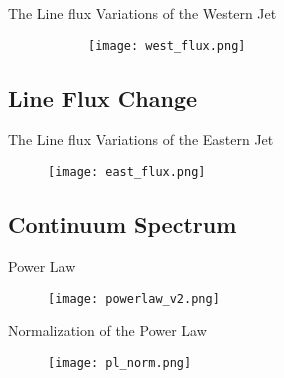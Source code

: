 \documentclass{beamer}
\begin{document}
\begin{frame}{The Line flux Variations of the Western Jet}
    \begin{figure}
        \begin{figure}
            \texttt{[image: west\_flux.png]}
            \label{west_flux}
        \end{figure}
    \end{figure}
\end{frame}


\subsection{Line Flux Change}
\begin{frame}{The Line flux Variations of the Eastern Jet}
\begin{figure}
    \centering
    \texttt{[image: east\_flux.png]}
    \label{east_flux}
\end{figure}
\end{frame}




\subsection{Continuum Spectrum}

\begin{frame}{Power Law}
        \begin{figure}
            \centering
            \texttt{[image: powerlaw\_v2.png]}
            \label{pl}
        \end{figure}
\end{frame}

\begin{frame}{Normalization of the Power Law}
            \begin{figure}
                \centering
                \texttt{[image: pl\_norm.png]}
                \label{norm_pl}
            \end{figure}
\end{frame}
\end{document}
